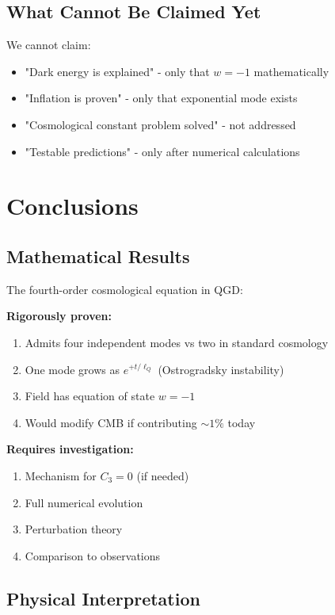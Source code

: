 \documentclass[11pt,a4paper]{article}
\theoremstyle{definition}
\theoremstyle{remark}
\begin{document}
	\subsection{What Cannot Be Claimed Yet}
	
	We cannot claim:
	\begin{itemize}
		\item "Dark energy is explained" - only that $w = -1$ mathematically
		\item "Inflation is proven" - only that exponential mode exists
		\item "Cosmological constant problem solved" - not addressed
		\item "Testable predictions" - only after numerical calculations
	\end{itemize}
	
	\section{Conclusions}
	
	\subsection{Mathematical Results}
	
	The fourth-order cosmological equation in QGD:
	
	\textbf{Rigorously proven:}
	\begin{enumerate}
		\item Admits four independent modes vs two in standard cosmology
		\item One mode grows as $e^{+t/\ell_Q}$ (Ostrogradsky instability)
		\item Field has equation of state $w = -1$
		\item Would modify CMB if contributing $\sim 1\%$ today
	\end{enumerate}
	
	\textbf{Requires investigation:}
	\begin{enumerate}
		\item Mechanism for $C_3 = 0$ (if needed)
		\item Full numerical evolution
		\item Perturbation theory
		\item Comparison to observations
	\end{enumerate}
	
	\subsection{Physical Interpretation}
	
\end{document}
